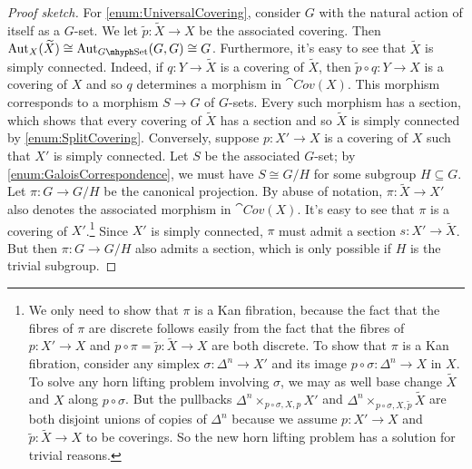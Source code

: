 \begin{proof}[Proof sketch]
	For \cref{enum:UniversalCovering}, consider $G$ with the natural action of itself as a $G$-set. We let $\widetilde{p}\colon \widetilde{X}\rightarrow X$ be the associated covering. Then $\Aut_X(\widetilde{X})\cong \Aut_{G\mhyph\cat{Set}}(G,G)\cong G$. Furthermore, it's easy to see that $\widetilde{X}$ is simply connected. Indeed, if $q\colon Y\rightarrow \widetilde{X}$ is a covering of $\widetilde{X}$, then $\widetilde{p}\circ q\colon Y\rightarrow X$ is a covering of $X$ and so $q$ determines a morphism in $\cat{Cov}(X)$. This morphism corresponds to a morphism $S\rightarrow G$ of $G$-sets. Every such morphism has a section, which shows that every covering of $\widetilde{X}$ has a section and so $\widetilde{X}$ is simply connected by \cref{enum:SplitCovering}. Conversely, suppose $p\colon X'\rightarrow X$ is a covering of $X$ such that $X'$ is simply connected. Let $S$ be the associated $G$-set; by \cref{enum:GaloisCorrespondence}, we must have $S\cong G/H$ for some subgroup $H\subseteq G$. Let $\pi\colon G\rightarrow G/H$ be the canonical projection. By abuse of notation, $\pi\colon \widetilde{X}\rightarrow X'$ also denotes the associated morphism in $\cat{Cov}(X)$. It's easy to see that $\pi$ is a covering of $X'$.\footnote{We only need to show that $\pi$ is a Kan fibration, because the fact that the fibres of $\pi$ are discrete follows easily from the fact that the fibres of $p\colon X'\rightarrow X$ and $p\circ \pi=\widetilde{p}\colon \widetilde{X}\rightarrow X$ are both discrete. To show that $\pi$ is a Kan fibration, consider any simplex $\sigma\colon \Delta^n\rightarrow X'$ and its image $p\circ\sigma\colon \Delta^n\rightarrow X$ in $X$. To solve any horn lifting problem involving $\sigma$, we may as well base change $\widetilde{X}$ and $X$ along $p\circ\sigma$. But the pullbacks $\Delta^n\times_{p\circ\sigma,X,p}X'$ and $\Delta^n\times_{p\circ\sigma,X,\widetilde{p}}\widetilde{X}$ are both disjoint unions of copies of $\Delta^n$ because we assume $p\colon X'\rightarrow X$ and $\widetilde{p}\colon \widetilde{X}\rightarrow X$ to be coverings. So the new horn lifting problem has a solution for trivial reasons.} Since $X'$ is simply connected, $\pi$ must admit a section $s\colon X'\rightarrow \widetilde{X}$. But then $\pi\colon G\rightarrow G/H$ also admits a section, which is only possible if $H$ is the trivial subgroup.
	

\end{proof}
